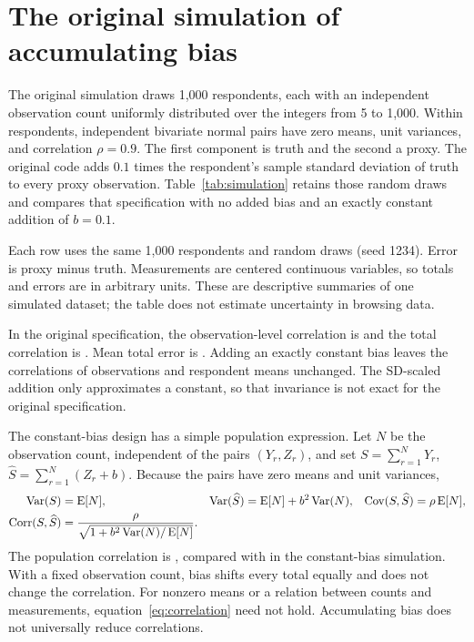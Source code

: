 \documentclass[11pt,letterpaper]{article}
\newcommand{\E}{\operatorname{E}}
\newcommand{\Var}{\operatorname{Var}}
\newcommand{\Cov}{\operatorname{Cov}}
\newcommand{\Corr}{\operatorname{Corr}}
\begin{document}
\section{The original simulation of accumulating bias}
The original simulation draws 1,000 respondents, each with an independent
observation count uniformly distributed over the integers from 5 to 1,000.
Within respondents, independent bivariate normal pairs have zero means, unit
variances, and correlation $\rho=0.9$. The first component is truth and the
second a proxy. The original code adds $0.1$ times the respondent's sample
standard deviation of truth to every proxy observation. Table~\ref{tab:simulation}
retains those random draws and compares that specification with no added bias
and an exactly constant addition of $b=0.1$.

\begin{table}[htbp]
\centering
\small
\caption{Correlations with truth and signed error in respondent totals}
\label{tab:simulation}

\par\smallskip
\begin{minipage}{\linewidth}\footnotesize
Each row uses the same 1,000 respondents and random draws (seed 1234).
Error is proxy minus truth. Measurements are centered continuous variables,
so totals and errors are in arbitrary units. These are descriptive summaries
of one simulated dataset; the table does not estimate uncertainty in browsing data.
\end{minipage}
\end{table}

In the original specification, the observation-level correlation is
\OriginalObservationCorrelation{} and the total correlation is
\OriginalTotalCorrelation{}. Mean total error is \OriginalMeanError{}.
Adding an exactly constant bias leaves the correlations of observations and
respondent means unchanged. The SD-scaled addition only approximates a constant,
so that invariance is not exact for the original specification.

The constant-bias design has a simple population expression. Let $N$ be the
observation count, independent of the pairs $(Y_r,Z_r)$, and set
$S=\sum_{r=1}^{N}Y_r$, $\widehat S=\sum_{r=1}^{N}(Z_r+b)$. Because the pairs
have zero means and unit variances,
\begin{align}
 \Var(S)&=\E[N],&
 \Var(\widehat S)&=\E[N]+b^2\Var(N),&
 \Cov(S,\widehat S)&=\rho\E[N],\notag\\
 \Corr(S,\widehat S)&=\frac{\rho}{\sqrt{1+b^2\Var(N)/\E[N]}}.
 \label{eq:correlation}
\end{align}
The population correlation is \TheoreticalTotalCorrelation{}, compared with
\ConstantTotalCorrelation{} in the constant-bias simulation. With a fixed
observation count, bias shifts every total equally and does not change the
correlation. For nonzero means or a relation between counts and measurements,
equation~\eqref{eq:correlation} need not hold. Accumulating bias does not
universally reduce correlations.
\end{document}
